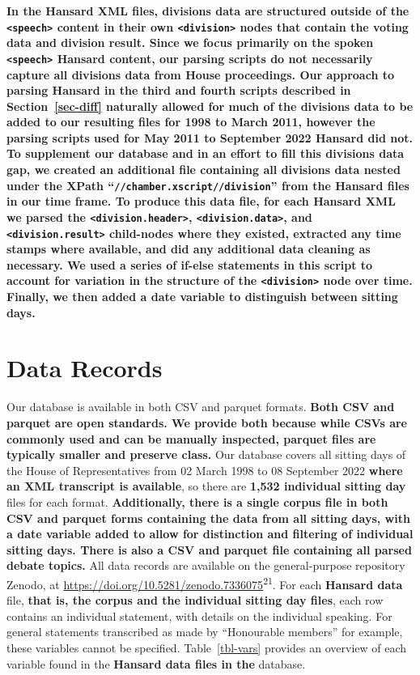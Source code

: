 \documentclass[
  letterpaper,
  DIV=11,
  numbers=noendperiod]{scrartcl}
\begin{document}
\textbf{In the Hansard XML files, divisions data are structured outside
of the \texttt{\textless{}speech\textgreater{}} content in their own
\texttt{\textless{}division\textgreater{}} nodes that contain the voting
data and division result. Since we focus primarily on the spoken
\texttt{\textless{}speech\textgreater{}} Hansard content, our parsing
scripts do not necessarily capture all divisions data from House
proceedings. Our approach to parsing Hansard in the third and fourth
scripts described in Section~\ref{sec-diff} naturally allowed for much
of the divisions data to be added to our resulting files for 1998 to
March 2011, however the parsing scripts used for May 2011 to September
2022 Hansard did not. To supplement our database and in an effort to
fill this divisions data gap, we created an additional file containing
all divisions data nested under the XPath
``\texttt{//chamber.xscript//division}'' from the Hansard files in our
time frame. To produce this data file, for each Hansard XML we parsed
the \texttt{\textless{}division.header\textgreater{}},
\texttt{\textless{}division.data\textgreater{}}, and
\texttt{\textless{}division.result\textgreater{}} child-nodes where they
existed, extracted any time stamps where available, and did any
additional data cleaning as necessary. We used a series of if-else
statements in this script to account for variation in the structure of
the \texttt{\textless{}division\textgreater{}} node over time. Finally,
we then added a date variable to distinguish between sitting days.}

\hypertarget{data-records}{%
\section{Data Records}\label{data-records}}

Our database is available in both CSV and parquet formats. \textbf{Both
CSV and parquet are open standards. We provide both because while CSVs
are commonly used and can be manually inspected, parquet files are
typically smaller and preserve class.} Our database covers all sitting
days of the House of Representatives from 02 March 1998 to 08 September
2022 \textbf{where an XML transcript is available}, so there are
\textbf{1,532 individual sitting day} files for each format.
\textbf{Additionally, there is a single corpus file in both CSV and
parquet forms containing the data from all sitting days, with a date
variable added to allow for distinction and filtering of individual
sitting days. There is also a CSV and parquet file containing all parsed
debate topics.} All data records are available on the general-purpose
repository Zenodo, at
\url{https://doi.org/10.5281/zenodo.7336075}\textsuperscript{21}. For
each \textbf{Hansard data} file, \textbf{that is, the corpus and the
individual sitting day files}, each row contains an individual
statement, with details on the individual speaking. For general
statements transcribed as made by ``Honourable members'' for example,
these variables cannot be specified. Table~\ref{tbl-vars} provides an
overview of each variable found in the \textbf{Hansard data files in
the} database.
\end{document}
